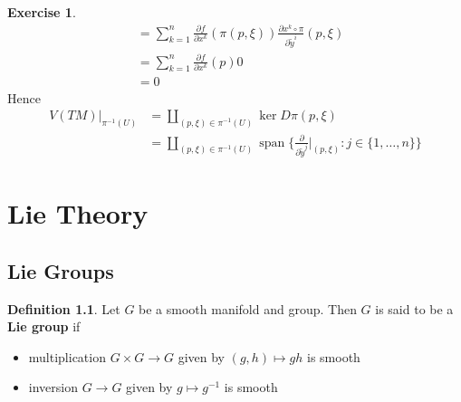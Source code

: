 \documentclass{book}
\theoremstyle{definition}
\newtheorem{defn}[definition]{Definition}
\newtheorem{ex}[definition]{Exercise}
\DeclareMathOperator{\spn}{span}
\DeclareMathOperator*{\0}{\mbf{0}}
\DeclareMathOperator*{\1}{\mbf{1}}
\newcommand{\tbf}[1]{\textbf{#1}}
\newcommand{\p}{\partial}
\begin{document}
\begin{ex}
\begin{align*}
			& = \sum_{k=1}^n \frac{\p f }{\p x^k}(\pi (p,\xi)) \frac{\p x^k \circ \pi }{\p \tilde{y}^i}(p,\xi) \\
			& = \sum_{k=1}^n \frac{\p f }{\p x^k}(p) 0 \\
			& = 0
		\end{align*}
		Hence 
		\begin{align*}
			V(TM)|_{\pi^{-1}(U)}
			& = \coprod_{(p, \xi) \in \pi^{-1}(U)} \ker D \pi(p, \xi) \\
			& = \coprod_{(p, \xi) \in \pi^{-1}(U)} \spn \bigg \{ \frac{\p}{\p \tilde{y}^j} \bigg|_{(p, \xi)}: j \in \{1, \ldots, n\} \bigg \} 
		\end{align*}
	\end{ex}
	
	
	
	
	
	
	
	
	
	
	
	
	
	
	
	
	
	
	
	
	
	
	
	
	
	
	
	
	
	
	
	
	
	
	\newpage
	\chapter{Lie Theory}
	
	\section{Lie Groups}
	
	\begin{defn}
		Let $G$ be a smooth manifold and group. Then $G$ is said to be a \tbf{Lie group} if 
		\begin{itemize}
			\item multiplication $G \times G \rightarrow G$ given by $(g, h) \mapsto gh$ is smooth
			\item inversion $G \rightarrow G$  given by $g \mapsto g^{-1}$ is smooth 
		\end{itemize} 
	\end{defn}

	
\end{document}
